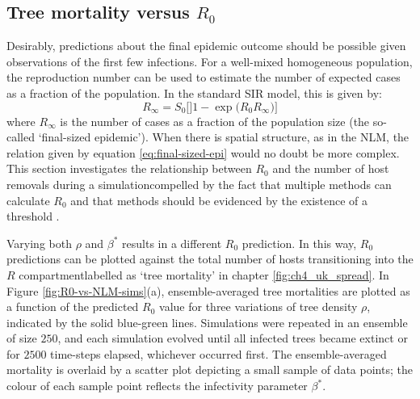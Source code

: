 \subsection{Tree mortality versus $R_0$}

Desirably, predictions about the final epidemic outcome should be possible given observations of the first few infections. 
For a well-mixed homogeneous population, the reproduction number can be used to estimate the number of expected cases as a fraction of the population.
In the standard SIR model, this is given by:
\begin{equation}
\label{eq:final-sized-epi}
    R_{\infty} = S_0\Big[]1 - \exp\big( R_0 R_\infty\big) \Big]
\end{equation}
where $R_\infty$ is the number of cases as a fraction of the population size (the so-called `final-sized epidemic'). 
When there is spatial structure, as in the NLM, the relation given by equation \ref{eq:final-sized-epi} would no doubt be more complex.
This section investigates the relationship between $R_0$ and the number of host removals during a simulation\textemdash compelled by the fact that multiple methods can calculate $R_0$ and that methods should be evidenced by the existence of a threshold \cite{li2011failure}.

Varying both $\rho$ and $\beta^*$ results in a different $R_0$ prediction.
In this way, $R_0$ predictions can be plotted against the total number of hosts transitioning into the $R$ compartment\textemdash labelled as `tree mortality' in chapter \ref{fig:ch4_uk_spread}.
In Figure \ref{fig:R0-vs-NLM-sims}(a), ensemble-averaged tree mortalities are plotted as a function of the predicted $R_0$ value for three variations of tree density $\rho$, indicated by the solid blue-green lines.
Simulations were repeated in an ensemble of size $250$, and each simulation evolved until all infected trees became extinct or for $2500$ time-steps elapsed, whichever occurred first.
The ensemble-averaged mortality is overlaid by a scatter plot depicting a small sample of data points; the colour of each sample point reflects the infectivity parameter $\beta^*$.

